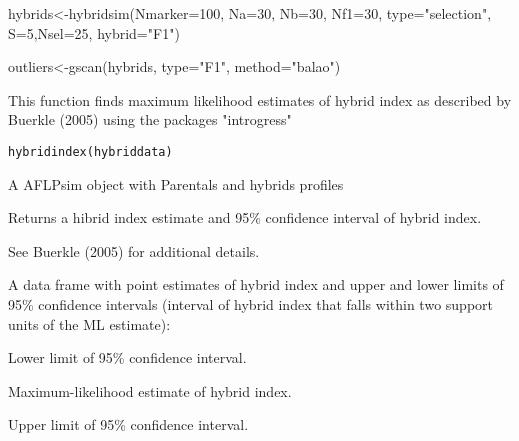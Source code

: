 \documentclass[letterpaper]{book}
\begin{document}
%
\begin{SeeAlso}\relax
{}
\end{SeeAlso}
%
\begin{Examples}
\begin{ExampleCode}
hybrids<-hybridsim(Nmarker=100, Na=30, Nb=30, Nf1=30, type="selection", S=5,Nsel=25, hybrid="F1")

outliers<-gscan(hybrids, type="F1", method="balao")
\end{ExampleCode}
\end{Examples}
%
\begin{Description}\relax
This function finds maximum likelihood estimates of hybrid index as described by Buerkle (2005) using the packages "introgress"
\end{Description}
%
\begin{Usage}
\begin{verbatim}
hybridindex(hybriddata)

\end{verbatim}
\end{Usage}
%
\begin{Arguments}
\begin{ldescription}
\item[\code{hybriddata}] 
A AFLPsim object with Parentals and hybrids profiles

\end{ldescription}
\end{Arguments}
%
\begin{Details}\relax
Returns a hibrid index estimate and 95\% confidence interval of hybrid index.

See Buerkle (2005) for additional details.
\end{Details}
%
\begin{Value}
A data frame with point estimates of hybrid index and upper and lower limits of 95\% confidence intervals (interval of hybrid index that falls within two support units of the ML estimate):

\begin{ldescription}
\item[\code{lower}]   
Lower limit of 95\% confidence interval.

\item[\code{h}] 
Maximum-likelihood estimate of hybrid index.

\item[\code{upper}] 
Upper limit of 95\% confidence interval.
\end{ldescription}
\end{Value}
\end{document}
